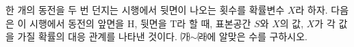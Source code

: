 한 개의 동전을 두 번 던지는 시행에서 뒷면이 나오는 횟수를 확률변수 $X$라 하자. 다음은 이 시행에서 동전의 앞면을 $\mathrm{H}$, 뒷면을 $\mathrm{T}$라 할 때, 표본공간 $S$와 $X$의 값, $X$가 각 값을 가질 확률의 대응 관계를 나타낸 것이다. ㈎$\sim$㈑에 알맞은 수를 구하시오.
\par\smallskip\begin{center}\resizebox{\ifdim\width>\linewidth\linewidth\else\width\fi}{!}{}\end{center}
